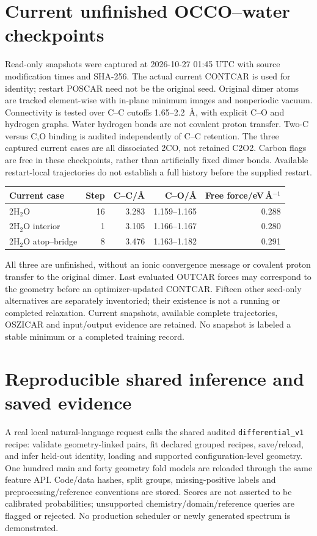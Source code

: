 \documentclass[11pt,a4paper]{article}
\begin{document}
\section{Current unfinished OCCO--water checkpoints}
Read-only snapshots were captured at 2026-10-27 01:45 UTC with source modification times and SHA-256. The actual current CONTCAR is used for identity; restart POSCAR need not be the original seed. Original dimer atoms are tracked element-wise with in-plane minimum images and nonperiodic vacuum. Connectivity is tested over C--C cutoffs 1.65--2.2~\AA, with explicit C--O and hydrogen graphs. Water hydrogen bonds are not covalent proton transfer. Two-C versus C,O binding is audited independently of C--C retention. The three captured current cases are all dissociated 2CO, not retained C2O2. Carbon flags are free in these checkpoints, rather than artificially fixed dimer bonds. Available restart-local trajectories do not establish a full history before the supplied restart.

\begin{center}\begin{tabular}{lrrrr}\toprule
Current case & Step & C--C/\AA & C--O/\AA & Free force/eV\,\AA$^{-1}$\\\midrule
2H$_2$O &16&3.283&1.159--1.165&0.288\\
2H$_2$O interior &1&3.105&1.166--1.167&0.280\\
2H$_2$O atop--bridge &8&3.476&1.163--1.182&0.291\\\bottomrule\end{tabular}\end{center}
All three are unfinished, without an ionic convergence message or covalent proton transfer to the original dimer. Last evaluated OUTCAR forces may correspond to the geometry before an optimizer-updated CONTCAR. Fifteen other seed-only alternatives are separately inventoried; their existence is not a running or completed relaxation. Current snapshots, available complete trajectories, OSZICAR and input/output evidence are retained. No snapshot is labeled a stable minimum or a completed training record.

\section{Reproducible shared inference and saved evidence}
A real local natural-language request calls the shared audited \texttt{differential\_v1} recipe: validate geometry-linked pairs, fit declared grouped recipes, save/reload, and infer held-out identity, loading and supported configuration-level geometry. One hundred main and forty geometry fold models are reloaded through the same feature API. Code/data hashes, split groups, missing-positive labels and preprocessing/reference conventions are stored. Scores are not asserted to be calibrated probabilities; unsupported chemistry/domain/reference queries are flagged or rejected. No production scheduler or newly generated spectrum is demonstrated.
\end{document}
